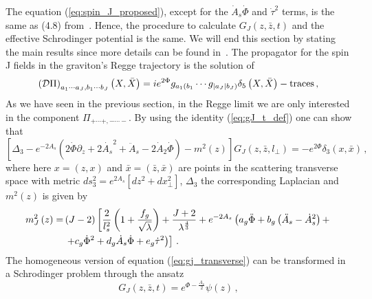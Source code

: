 \documentclass[a4paper,12pt]{article}
\begin{document}

The equation (\ref{eq:spin_J_proposed}), except for the $\dot{A}_s \dot{\Phi}$ and $\dot{\tau}^2$ terms, is the same as (4.8) from~\cite{ballon_bayona_unity_2017}. Hence, the procedure to calculate $G_J\left(z, \bar{z}, t\right)$ and the effective Schrodinger potential is the same. We will end this section by stating the main results since more details can be found in~\cite{ballon_bayona_unity_2017}.
The propagator for the spin J fields in the graviton's Regge trajectory is the solution of
\begin{equation}
\left( \mathcal{D} \Pi \right)_{a_1 \cdots a_J, b_1 \cdots b_J} \left(X, \bar{X}\right) = i e^{2 \Phi} g_{a_1(b_1} \cdots g_{|a_J|b_J)} \delta_5 \left(X, \bar{X}\right) - \rm{traces} \, ,
\end{equation}
As we have seen in the previous section, in the Regge limit we are only interested in the component $\Pi_{+\cdots+, - \cdots -}$. By using the identity (\ref{eq:gJ_t_def}) one can show that
\begin{equation}
\left[ \Delta_3 - e^{-2A_s} \left( 2 \dot{\Phi} \partial_z + 2 {\dot{A_s}}^2 + \ddot{A}_s - 2 \dot{A}_2 \dot{\Phi}  \right) - m^2 \left( z \right) \right] G_J \left( z, \bar{z}, l_\perp \right) = - e^{2 \Phi } \delta_3 \left(x, \bar{x} \right) \, ,
\label{eq:gj_transverse}
\end{equation}
where here $x = (z, x )$ and $\bar{x} = ( \bar{z}, \bar{x} )$ are points in the scattering transverse space with metric $ds^2_3 = e^{2A_s} \left[ dz^2 + d x^2_\perp\right] $,  $\Delta_3$ the corresponding Laplacian and $m^2(z)$ is given by
\begin{align}
m_J^2\left(z\right) = & \left(J - 2 \right) \left[ \frac{2}{l_s^2} \left(1 + \frac{f_g}{\sqrt{\lambda}} \right) + \frac{J+2}{\lambda^\frac{4}{3}} + e^{-2 A_s} \left( a_g \ddot{\Phi} + b_g \left( \ddot{A}_s - {\dot{A}_s}^2 \right) + \right . \right. \notag \\
&\left. \left. + c_g {\dot{\Phi}}^2 + d_g \dot{A}_s \dot{\Phi} + e_g {\dot{\tau}}^2  \right)  \right] \, .
\end{align}
The homogeneous version of equation (\ref{eq:gj_transverse}) can be transformed in a Schrodinger problem through the ansatz
\begin{equation}
G_J \left(z, \bar{z}, t\right) = e^{\Phi - \frac{A_s}{2}} \psi (z) \, ,
\end{equation}
\end{document}
